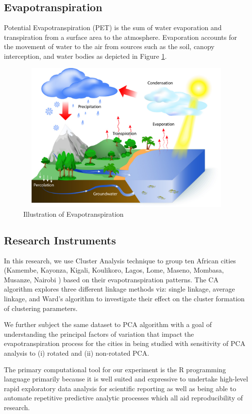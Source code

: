 \documentclass[12pt,a4paper]{article}
\begin{document}
\subsection{Evapotranspiration}
Potential Evapotranspiration (PET) is the sum of water evaporation and transpiration from a surface area to the atmosphere.  Evaporation accounts for the movement of water to the air from sources such as the soil, canopy interception, and water bodies as depicted in Figure \ref{fig:evapo}.
\begin{figure}[!h]
			\includegraphics[width=430pt,  height=215pt]{./gaphics/evapotranspiration.jpg}
			\caption{Illustration of Evapotranspiration}
			\label{fig:evapo}
\end{figure}
\subsection{Research Instruments}
In this research, we use Cluster Analysis technique to group ten African cities (Kamembe, Kayonza, Kigali, Koulikoro, Lagos, Lome, Maseno, Mombasa, Musanze, Nairobi ) based on their evapotranspiration patterns.
The CA algorithm explores three different linkage methods viz: single linkage,  average linkage,  and Ward’s algorithm to investigate their effect on the cluster formation of clustering parameters.

We further subject the same dataset to PCA algorithm with a goal of understanding the principal factors of variation that impact the evapotranspiration process for the cities in being studied with  sensitivity
of PCA analysis to (i) rotated and (ii) non-rotated PCA.

The primary computational tool for our experiment is the R programming language primarily because it is well suited and expressive to undertake high-level rapid exploratory data analysis for scientific reporting as well as being able to automate repetitive predictive analytic processes which all aid reproducibility of research.
\end{document}
